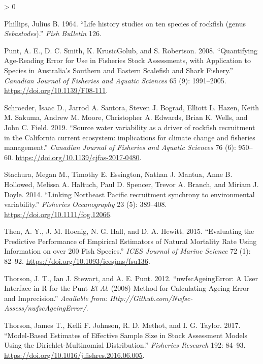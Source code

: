 \documentclass[11pt,
  english,
  a4paper,
]{article}
\newlength{\cslhangindent}
\newenvironment{CSLReferences}[2] %
 {%
  \setlength{\parindent}{0pt}
  \ifodd #1 \everypar{\setlength{\hangindent}{\cslhangindent}}\ignorespaces\fi
  \ifnum #2 > 0
  \setlength{\parskip}{#2\baselineskip}
  \fi
 }%
 {}
\begin{document}
\begin{CSLReferences}{1}{0}
\leavevmode\hypertarget{ref-Phillips1964}{}%
Phillips, Julius B. 1964. {``{Life history studies on ten species of rockfish (genus \emph{Sebastodes})}.''} \emph{Fish Bulletin} 126.

\leavevmode\hypertarget{ref-punt_quantifying_2008}{}%
Punt, A. E., D. C. Smith, K. KrusicGolub, and S. Robertson. 2008. {``Quantifying Age-Reading Error for Use in Fisheries Stock Assessments, with Application to Species in {A}ustralia's Southern and Eastern Scalefish and Shark Fishery.''} \emph{Canadian Journal of Fisheries and Aquatic Sciences} 65 (9): 1991--2005. \url{https://doi.org/10.1139/F08-111}.

\leavevmode\hypertarget{ref-Schroeder2019}{}%
Schroeder, Isaac D., Jarrod A. Santora, Steven J. Bograd, Elliott L. Hazen, Keith M. Sakuma, Andrew M. Moore, Christopher A. Edwards, Brian K. Wells, and John C. Field. 2019. {``{Source water variability as a driver of rockfish recruitment in the California current ecosystem: implications for climate change and fisheries management}.''} \emph{Canadian Journal of Fisheries and Aquatic Sciences} 76 (6): 950--60. \url{https://doi.org/10.1139/cjfas-2017-0480}.

\leavevmode\hypertarget{ref-Stachura2014}{}%
Stachura, Megan M., Timothy E. Essington, Nathan J. Mantua, Anne B. Hollowed, Melissa A. Haltuch, Paul D. Spencer, Trevor A. Branch, and Miriam J. Doyle. 2014. {``{Linking Northeast Pacific recruitment synchrony to environmental variability}.''} \emph{Fisheries Oceanography} 23 (5): 389--408. \url{https://doi.org/10.1111/fog.12066}.

\leavevmode\hypertarget{ref-then_evaluating_2015-1}{}%
Then, A. Y., J. M. Hoenig, N. G. Hall, and D. A. Hewitt. 2015. {``Evaluating the Predictive Performance of Empirical Estimators of Natural Mortality Rate Using Information on over 200 Fish Species.''} \emph{ICES Journal of Marine Science} 72 (1): 82--92. \url{https://doi.org/10.1093/icesjms/fsu136}.

\leavevmode\hypertarget{ref-thorson_nwfscageingerror:_2012}{}%
Thorson, J. T., Ian J. Stewart, and A. E. Punt. 2012. {``{nwfscAgeingError}: A User Interface in {R} for the {P}unt \emph{Et Al}. (2008) Method for Calculating Ageing Error and Imprecision.''} \emph{Available from: Http://Github.com/Nwfsc-Assess/nwfscAgeingError/}.

\leavevmode\hypertarget{ref-thorson_model-based_2017}{}%
Thorson, James T., Kelli F. Johnson, R. D. Methot, and I. G. Taylor. 2017. {``Model-Based Estimates of Effective Sample Size in Stock Assessment Models Using the {Dirichlet}-Multinomial Distribution.''} \emph{Fisheries Research} 192: 84--93. \url{https://doi.org/10.1016/j.fishres.2016.06.005}.


\end{CSLReferences}
\end{document}

